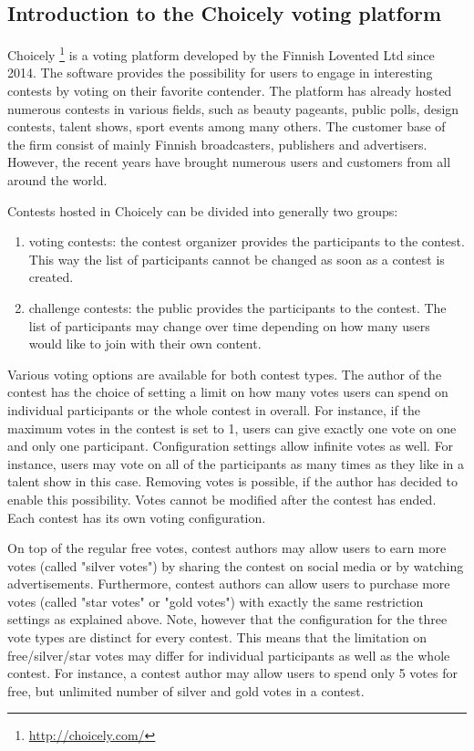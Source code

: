 \subsection{Introduction to the Choicely voting platform}
    Choicely \footnote{\url{http://choicely.com/}} is a voting platform developed by the Finnish Lovented Ltd since 2014. The software provides the possibility for users to engage in interesting contests by voting on their favorite contender. The platform has already hosted numerous contests in various fields, such as beauty pageants, public polls, design contests, talent shows, sport events among many others. The customer base of the firm consist of mainly Finnish broadcasters, publishers and advertisers. However, the recent years have brought numerous users and customers from all around the world.
    
    Contests hosted in Choicely can be divided into generally two groups:
    
    \begin{enumerate}
        \item voting contests: the contest organizer provides the participants to the contest. This way the list of participants cannot be changed as soon as a contest is created.
        \item challenge contests: the public provides the participants to the contest. The list of participants may change over time depending on how many users would like to join with their own content. 
    \end{enumerate}
    
    Various voting options are available for both contest types. The author of the contest has the choice of setting a limit on how many votes users can spend on individual participants or the whole contest in overall. For instance, if the maximum votes in the contest is set to 1, users can give exactly one vote on one and only one participant. Configuration settings allow infinite votes as well. For instance, users may vote on all of the participants as many times as they like in a talent show in this case. Removing votes is possible, if the author has decided to enable this possibility. Votes cannot be modified after the contest has ended. Each contest has its own voting configuration.
    
    On top of the regular free votes, contest authors may allow users to earn more votes (called "silver votes") by sharing the contest on social media or by watching advertisements. Furthermore, contest authors can allow users to purchase more votes (called "star votes" or "gold votes") with exactly the same restriction settings as explained above. Note, however that the configuration for the three vote types are distinct for every contest. This means that the limitation on free/silver/star votes may differ for individual participants as well as the whole contest. For instance, a contest author may allow users to spend only 5 votes for free, but unlimited number of silver and gold votes in a contest.

